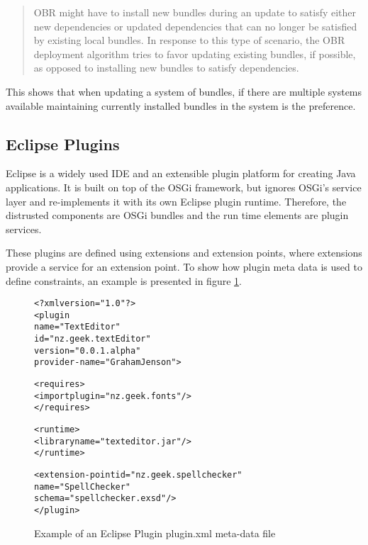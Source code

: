 \begin{quotation}
OBR might have to install new bundles during an update to satisfy either new dependencies or updated dependencies that can no longer be satisfied by existing local bundles. 
In response to this type of scenario, the OBR deployment algorithm tries to favor updating existing bundles, if possible, as opposed to installing new bundles to satisfy dependencies.
\end{quotation}

This shows that when updating a system of bundles, if there are multiple systems available maintaining currently installed bundles in the system is the preference.

\subsection{Eclipse Plugins}
Eclipse is a widely used IDE and an extensible plugin platform for creating Java applications.
It is built on top of the OSGi framework, but ignores OSGi's service layer and re-implements it with its own Eclipse plugin runtime.
Therefore, the distrusted components are OSGi bundles and the run time elements are plugin services.

These plugins are defined using extensions and extension points, where extensions provide a service for an extension point.
To show how plugin meta data is used to define constraints, an example is presented in figure \ref{eclipseplugin}. 

\begin{figure}[htp]
\begin{center}
\begin{alltt}
<?xml version="1.0"?>
<plugin
    name="Text Editor"
    id="nz.geek.textEditor"
    version="0.0.1.alpha"
    provider-name="Graham Jenson">
    
    <requires>
        <import plugin="nz.geek.fonts"/>
    </requires>

    <runtime>
        <library name="texteditor.jar"/>
    </runtime>
    
    <extension-point id="nz.geek.spellchecker" 
        name="Spell Checker" 
        schema="spellchecker.exsd"/>
</plugin>
\end{alltt}
  \caption[Eclipse Plugin meta-data]{Example of an Eclipse Plugin plugin.xml meta-data file}
  \label{eclipseplugin}
\end{center}
\end{figure}

